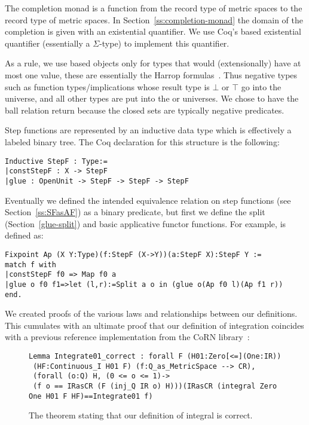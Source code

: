 \documentclass{elsarticle}
\newcommand{\tmtexttt}[1]{{\ttfamily{#1}}}
\begin{document}
The completion monad is a function from the record type of metric spaces to
the record type of metric spaces. In Section~\ref{ss:completion-monad} the
domain of the completion is given with an existential quantifier. We use
Coq's \tmtexttt{Set} based existential quantifier (essentially a
$\Sigma$-type) to implement this quantifier.

As a rule, we use \tmtexttt{Prop} based objects only for types that would
(extensionally) have at most one value, these are essentially the Harrop
formulas~{\cite{lcf:spi:03}}. Thus negative types such as function
types/implications whose result type is $\bot$ or $\top$ go into the
\tmtexttt{Prop} universe, and all other types are put into the \tmtexttt{Set}
or \tmtexttt{Type} universes. We chose to have the ball relation return
\tmtexttt{Prop} because the closed sets are typically negative predicates.

Step functions are represented by an inductive data type which is effectively
a labeled binary tree. The Coq declaration for this structure is the
following:
\begin{verbatim}
Inductive StepF : Type:=
|constStepF : X -> StepF
|glue : OpenUnit -> StepF -> StepF -> StepF
\end{verbatim}

Eventually we defined the intended equivalence relation on step functions (see
Section~\ref{ss:SFasAF}) as a binary predicate, but first we define the split
(Section~\ref{glue-split}) and basic applicative functor functions. For
example, \tmtexttt{Ap} is defined as:
\begin{verbatim}
Fixpoint Ap (X Y:Type)(f:StepF (X->Y))(a:StepF X):StepF Y :=
match f with
|constStepF f0 => Map f0 a
|glue o f0 f1=>let (l,r):=Split a o in (glue o(Ap f0 l)(Ap f1 r))
end.
\end{verbatim}

We created proofs of the various laws and relationships between our
definitions. This cumulates with an ultimate proof that our definition of
integration coincides with a previous reference implementation from the CoRN
library~{\cite{lcf:03}}:
\begin{figure}
\begin{verbatim}
Lemma Integrate01_correct : forall F (H01:Zero[<=](One:IR))
 (HF:Continuous_I H01 F) (f:Q_as_MetricSpace --> CR),
 (forall (o:Q) H, (0 <= o <= 1)->
 (f o == IRasCR (F (inj_Q IR o) H)))(IRasCR (integral Zero One H01 F HF)==Integrate01 f)\end{verbatim}\caption{The theorem stating that our definition of integral is correct.}
\end{figure}
\end{document}
